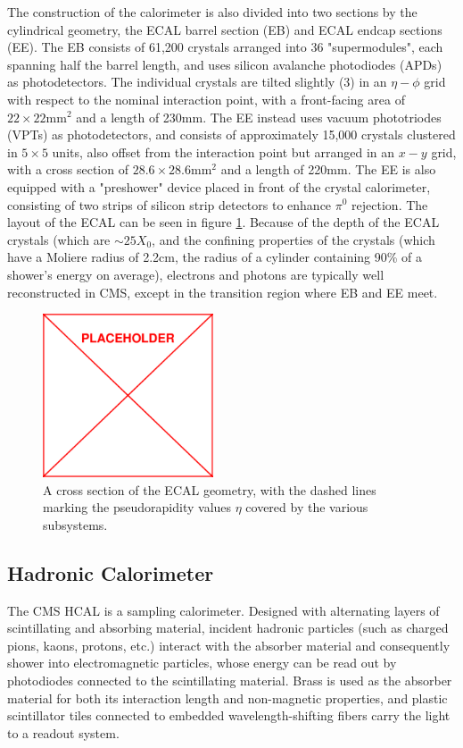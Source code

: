 The construction of the calorimeter is also divided into two sections by the cylindrical geometry, the ECAL barrel section (EB) and ECAL endcap sections (EE). The EB consists of 61,200 crystals arranged into 36 "supermodules", each spanning half the barrel length, and uses silicon avalanche photodiodes (APDs) as photodetectors. The individual crystals are tilted slightly (3\textdegree) in an $\eta-\phi$ grid with respect to the nominal interaction point, with a front-facing area of $22\times22\text{mm}^2$ and a length of 230mm. The EE instead uses vacuum phototriodes (VPTs) as photodetectors, and consists of approximately 15,000 crystals clustered in $5\times5$ units, also offset from the interaction point but arranged in an $x-y$ grid, with a cross section of $28.6\times28.6\text{mm}^2$ and a length of 220mm. The EE is also equipped with a "preshower" device placed in front of the crystal calorimeter, consisting of two strips of silicon strip detectors to enhance $\pi^0$ rejection. The layout of the ECAL can be seen in figure \ref{fig:ecalGeometry}. Because of the depth of the ECAL crystals (which are $\sim25X_0$, and the confining properties of the crystals (which have a Moliere radius of 2.2cm, the radius of a cylinder containing 90\% of a shower's energy on average), electrons and photons are typically well reconstructed in CMS, except in the transition region where EB and EE meet.
\begin{figure}
	\centering
	\includegraphics[width=0.45\textwidth]{figs/placeholder}
	\caption{A cross section of the ECAL geometry, with the dashed lines marking the pseudorapidity values $\eta$ covered by the various subsystems.}
	\label{fig:ecalGeometry}
\end{figure}

\subsection{Hadronic Calorimeter}
\label{subsec:hcal}
The CMS HCAL is a sampling calorimeter. Designed with alternating layers of scintillating and absorbing material, incident hadronic particles (such as charged pions, kaons, protons, etc.) interact with the absorber material and consequently shower into electromagnetic particles, whose energy can be read out by photodiodes connected to the scintillating material. Brass is used as the absorber material for both its interaction length and non-magnetic properties, and plastic scintillator tiles connected to embedded wavelength-shifting fibers carry the light to a readout system.

